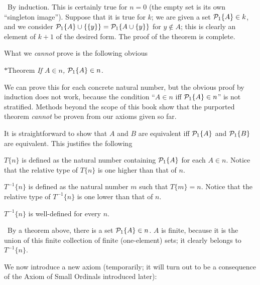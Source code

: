 \preuve\ By induction.  This is certainly true
for $n=0$ (the empty set is its own
``singleton image'').  Suppose that it is true
for $k$; we are given a set ${\cal P}_1\{A\}\in k$, and we consider
${\cal P}_1\{A\} \cup \{\{y\}\} ={\cal P}_1\{A \cup \{y\}\} $ for $y
\not\in A$; this is clearly an element of $k+1$ of the desired form.
The proof of the theorem is complete.
\finpreuve

What we {\itshape cannot\/} prove is the following obvious

\begin{ThmEtc}{$*$Theorem}\slshape
 If $A \in n$, ${\cal P}_1\{A\} \in n$.
\end{ThmEtc}

We can prove this for each concrete natural number, but
the obvious proof by induction does not work,
because the condition ``$A \in n$ iff ${\cal P}_1\{A\} \in n$'' is not
stratified.  Methods beyond the scope of this book show
that the purported theorem {\itshape cannot\/} be proven from our axioms given
so far.

It is straightforward to show that $A$ and $B$ are equivalent iff ${\cal P}_1\{A\}$ and ${\cal P}_1\{B\}$ are equivalent.
This justifies the following

\begin{definitions}
 $T\{n\}$ is defined as the
   natural 
   number containing ${\cal P}_1\{A\}$ for each $A \in n$.  Notice that the 
   relative type of $T\{n\}$ is one higher than that of
   $n$.

 $T^{-1}\{n\}$ is defined as the natural number $m$
   such that $T\{m\} = n$.  Notice that the relative type of
   $T^{-1}\{n\}$ is one lower than that of $n$.
\end{definitions}

\begin{thm}
 $T^{-1}\{n\}$ is well-defined for every $n$.
\end{thm}

\preuve\ By a theorem above, there is a set ${\cal P}_1\{A\} \in
n$.  $A$ is finite, because it is the union of this finite
collection of finite (one-element) sets; it clearly belongs to $T^{-1}\{n\}$.
\finpreuve

We now introduce a new axiom (temporarily; it will turn out to be a
consequence of the Axiom of Small Ordinals
introduced later):

